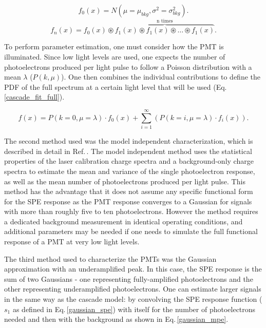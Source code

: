 \documentclass[11pt,a4paper]{article}
\newcommand\eqnref[1]{Eq.\,\ref{#1}}
\newcommand\citeref[1]{Ref.\,\cite{#1}}
\begin{document}
\begin{equation}
\label{bkg_spec}
f_0(x) = N(\mu=\mu_{bkg}, \sigma^2=\sigma^2_{bkg}).
\end{equation}
\begin{equation}
\label{spe_convolution}
f_n(x) = f_0(x) \circledast \overbrace{f_1(x) \circledast f_1(x) \circledast \ldots \circledast f_1(x)}^{\text{n times}}.
\end{equation}

To perform parameter estimation, one must consider how the PMT is illuminated.  Since low light levels are used, one expects the number of photoelectrons produced per light pulse to follow a Poisson distribution with a mean $\lambda$ ($P(k, \mu)$).  One then combines the individual contributions to define the PDF of the full spectrum at a certain light level that will be used (\eqnref{cascade_fit_full}).

\begin{equation}
\label{cascade_fit_full}
f(x) = P(k=0, \mu=\lambda) \cdot f_0(x) + \sum^{\infty}_{i=1} (P(k=i, \mu=\lambda) \cdot f_i(x)).
\end{equation}

The second method used was the model independent characterization, which is described in detail in \citeref{saldanha}.  The model independent method uses the statistical properties of the laser calibration charge spectra and a background-only charge spectra to estimate the mean and variance of the single photoelectron response, as well as the mean number of photoelectrons produced per light pulse. This method has the advantage that it does not assume any specific functional form for the SPE response as the PMT response converges to a Gaussian for signals with more than roughly five to ten photoelectrons. However the method requires a dedicated background measurement in identical operating conditions, and additional parameters may be needed if one needs to simulate the full functional response of a PMT at very low light levels.

The third method used to characterize the PMTs was the Gaussian approximation with an underamplified peak.  In this case, the SPE response is the sum of two  Gaussians - one representing fully-amplified photoelectrons and the other representing underamplified photoelectrons.  One can estimate larger signals in the same way as the cascade model: by convolving the SPE response function ($s_1$ as defined in \eqnref{gaussian_spe}) with itself for the number of photoelectrons needed and then with the background as shown in \eqnref{gaussian_mpe}.  
\end{document}
